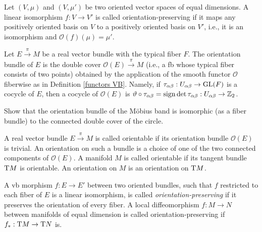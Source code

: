 \begin{defn}
    Let $(V,\mu)$ and $(V,\mu')$ be two oriented vector spaces of equal dimensions. A linear isomorphism $f:V\to V'$ is called orientation-preserving if it maps any positively oriented basis on $V$ to a positively oriented basis on $V'$, i.e., it is an isomorphism and $\mathcal{O}(f)(\mu)=\mu'$.
\end{defn}


\begin{defn}\label{def orientation bundle}
    Let $E\overset\pi\to M$ be a real vector bundle with the typical fiber $F$. The orientation bundle of $E$ is the double cover $\mathcal{O}(E)\overset{\pi}\to M$ (i.e., a \gls{fb} whose typical fiber consists of two points) obtained by the application of the smooth functor $\mathcal{O}$ fiberwise as in Definition \ref{functors VB}. Namely, if $\tau_{\alpha\beta}:U_{\alpha\beta}\to\operatorname{GL}(F)$ is a cocycle of $E$, then a cocycle of $\mathcal{O}(E)$ is $\vartheta\circ\tau_{\alpha\beta}=\operatorname{sign}\det\tau_{\alpha\beta}:U_{\alpha\beta}\to\mathbb{Z}_2$.
\end{defn}

\begin{xca}
    Show that the orientation bundle of the M\"obius band is isomorphic (as a fiber bundle) to the connected double cover of the circle.
\end{xca}

\begin{defn}
    A real vector bundle $E\overset\pi\to M$ is called orientable if its orientation bundle $\mathcal{O}(E)$ is trivial. An orientation on such a bundle is a choice of one of the two connected components of $\mathcal{O}(E)$. A manifold $M$ is called orientable if its tangent bundle $\mathrm{T} M$ is orientable. An orientation on $M$ is an orientation on $\mathrm{T} M$.

    A \gls{vb} morphism $f:E\to E'$ between two oriented bundles, such that $f$ restricted to each fiber of $E$ is a linear isomorphism, is called \emph{orientation-preserving} if it preserves the orientation of every fiber. A local diffeomorphism $f:M\to N$ between manifolds of equal dimension is called orientation-preserving if $f_\ast:\mathrm{T} M\to \mathrm{T} N$ is.
\end{defn}

